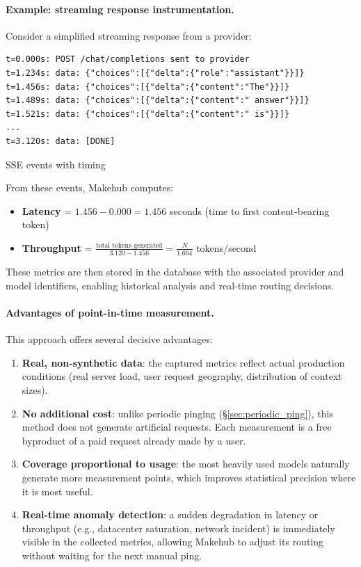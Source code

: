 \documentclass[english]{article}
\begin{document}
\paragraph{Example: streaming response instrumentation.}

Consider a simplified streaming response from a provider:

\begin{listing}[H]
\begin{verbatim}
t=0.000s: POST /chat/completions sent to provider
t=1.234s: data: {"choices":[{"delta":{"role":"assistant"}}]}
t=1.456s: data: {"choices":[{"delta":{"content":"The"}}]}
t=1.489s: data: {"choices":[{"delta":{"content":" answer"}}]}
t=1.521s: data: {"choices":[{"delta":{"content":" is"}}]}
...
t=3.120s: data: [DONE]
\end{verbatim}
\caption{SSE events with timing}
\end{listing}

From these events, Makehub computes:
\begin{itemize}
    \item \textbf{Latency} = $1.456 - 0.000 = 1.456$ seconds (time to first content-bearing token)
    \item \textbf{Throughput} = $\frac{\text{total tokens generated}}{3.120 - 1.456} = \frac{N}{1.664}$ tokens/second
\end{itemize}

These metrics are then stored in the database with the associated provider and model identifiers, enabling historical analysis and real-time routing decisions.

\paragraph{Advantages of point-in-time measurement.}

This approach offers several decisive advantages:
\begin{enumerate}
    \item \textbf{Real, non-synthetic data}: the captured metrics reflect actual production conditions (real server load, user request geography, distribution of context sizes).

    \item \textbf{No additional cost}: unlike periodic pinging (\S\ref{sec:periodic_ping}), this method does not generate artificial requests. Each measurement is a free byproduct of a paid request already made by a user.

    \item \textbf{Coverage proportional to usage}: the most heavily used models naturally generate more measurement points, which improves statistical precision where it is most useful.

    \item \textbf{Real-time anomaly detection}: a sudden degradation in latency or throughput (e.g., datacenter saturation, network incident) is immediately visible in the collected metrics, allowing Makehub to adjust its routing without waiting for the next manual ping.
\end{enumerate}
\end{document}
